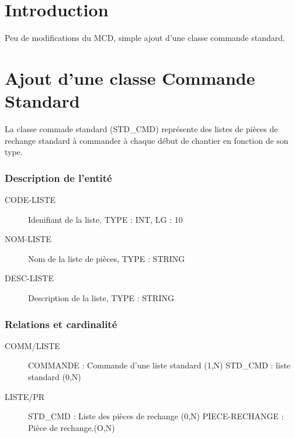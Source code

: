 \documentclass[a4paper]{article}
\begin{document}
\maketitle

\section{Introduction}
Peu de modifications du MCD, simple ajout d'une classe commande standard.


\section{Ajout d'une classe Commande Standard}

La classe commade standard (STD_CMD) représente des listes de pièces de 
rechange standard à commander à chaque début de chantier en fonction de son type.

\subsubsection{Description de l'entité}
\begin{description}
    \item[CODE-LISTE] Idenifiant de la liste, TYPE : INT, LG : 10
    \item[NOM-LISTE] Nom de la liste de pièces, TYPE : STRING
    \item[DESC-LISTE] Description de la liste, TYPE : STRING
\end{description}

\subsubsection{Relations et cardinalité}
\begin{description}
    \item[COMM/LISTE] COMMANDE : Commande d'une liste standard (1,N)\el
        STD_CMD : liste standard (0,N)
    \item[LISTE/PR] STD_CMD : Liste des pièces de rechange (0,N)\el
        PIECE-RECHANGE :  Pièce de rechange.(O,N)
\end{description}


\subsection{}
\end{document}

